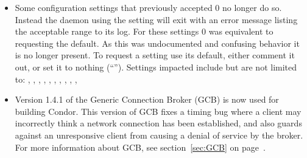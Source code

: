 \begin{itemize}
\item Some configuration settings that previously accepted 0 no
  longer do so.  Instead the daemon using the setting will exit
  with an error message listing the acceptable range to its log.
  For these settings 0 was equivalent to requesting the default.
  As this was undocumented and confusing behavior it is no longer
  present.  To request a setting use its default, either comment it
  out, or set it to nothing (``'').
  Settings impacted include but are not limited to: 
  ,
  ,
  ,
  ,
  ,
  ,
  ,
  ,
  ,
  ,

\item Version 1.4.1 of the Generic Connection Broker (GCB) is
  now used for building Condor.  This version of GCB fixes a timing bug
  where a client may incorrectly think a network connection has been established,
  and also guards against an unresponsive client from causing a denial of
  service by the broker.
  For more information about GCB, see section~\ref{sec:GCB} on
  page~\pageref{sec:GCB}. 

%

\end{itemize}


